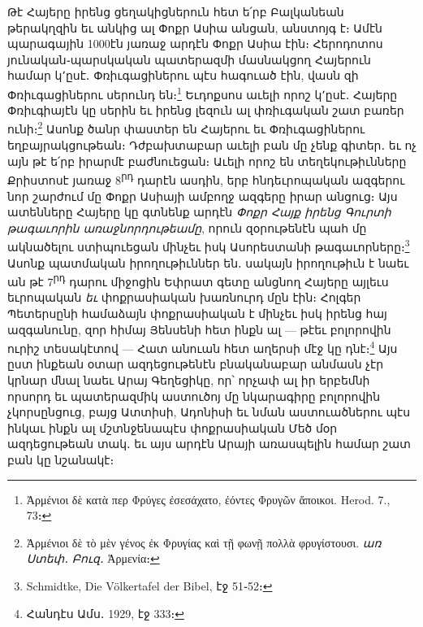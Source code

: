 \documentclass{article}
\begin{document}
{Թէ Հայերը իրենց ցեղակիցներուն հետ ե՛րբ Բալկանեան թերակղզին եւ անկից ալ Փոքր Ասիա անցան, անստոյգ է։ Ամէն պարագային 1000էն յառաջ արդէն Փոքր Ասիա էին։ Հերոդոտոս յունական֊պարսկական պատերազմի մասնակցող Հայերուն համար կ՚ըսէ․ Փռիւգացիներու պէս հագուած էին, վասն զի Փռիւգացիներու սերունդ են։\footnote{Ἀρμένιοι δὲ κατὰ περ Φρύγες ἐσεσάχατο, ἐόντες Φρυγῶν ἄποικοι. Herod. 7., 73։} Եւդոքսոս աւելի որոշ կ՚ըսէ․ Հայերը Փռիւգիայէն կը սերին եւ իրենց լեզուն ալ փռիւգական շատ բառեր ունի։\footnote{Ἀρμένιοι δὲ τὸ μὲν γένος ἐκ Φρυγίας καὶ τῇ φωνῇ πολλὰ φρυγίστουσι. \emph{առ Ստեփ․ Բուզ․} Ἀρμενία։} Ասոնք ծանր փաստեր են Հայերու եւ Փռիւգացիներու եղբայրակցութեան։ Դժբախտաբար աւելի բան մը չենք գիտեր․ եւ ոչ այն թէ ե՛րբ իրարմէ բաժնուեցան։ Աւելի որոշ են տեղեկութիւնները Քրիստոսէ յառաջ 8\textsuperscript{րդ} դարէն ասդին, երբ հնդեւրոպական ազգերու նոր շարժում մը Փոքր Ասիայի ամբողջ ազգերը իրար անցուց։ Այս ատենները Հայերը կը գտնենք արդէն \emph{Փոքր Հայք իրենց Գուրտի թագաւորին առաջնորդութեամը}, որուն զօրութենէն պահ մը ակնածելու ստիպուեցան մինչեւ իսկ Ասորեստանի թագաւորները։\footnote{Schmidtke, Die Völkertafel der Bibel, էջ 51֊52։} Ասոնք պատմական իրողութիւններ են․ սակայն իրողութիւն է նաեւ ան թէ 7\textsuperscript{րդ} դարու միջոցին Եփրատ գետը անցնող Հայերը այլեւս եւրոպական \emph{եւ} փոքրասիական խառնուրդ մըն էին։ Հոլգեր Պետերսընի համաձայն փոքրասիական է մինչեւ իսկ իրենց հայ ազգանունը, զոր հիմայ Յենսենի հետ ինքն ալ — թէեւ բոլորովին ուրիշ տեսակէտով — Հատ անուան հետ աղերսի մէջ կը դնէ։\footnote{Հանդէս Ամս․ 1929, էջ 333։} Այս ըստ ինքեան օտար ազդեցութենէն բնականաբար անմասն չէր կրնար մնալ նաեւ Արայ Գեղեցիկը, որ՝ որչափ ալ իր երբեմնի որսորդ եւ պատերազմիկ աստուծոյ մը նկարագիրը բոլորովին չկորսընցուց, բայց Ատտիսի, Ադոնիսի եւ նման աստուածներու պէս ինկաւ ինքն ալ մշտնջենապէս փոքրասիական Մեծ մօր ազդեցութեան տակ․ եւ այս արդէն Արայի առասպելին համար շատ բան կը նշանակէ։}
\clearpage
\end{document}
